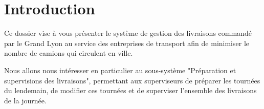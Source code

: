 \chapter*{Introduction}

Ce dossier vise à vous présenter le système de gestion des livraisons commandé par le Grand Lyon au service des entreprises de transport afin de minimiser le nombre de camions qui circulent en ville.

Nous allons nous intéresser en particulier au sous-système "Préparation et supervisions des livraisons", permettant aux superviseurs de préparer les tournées du lendemain, de modifier ces tournées et de superviser l'ensemble des livraisons de la journée.